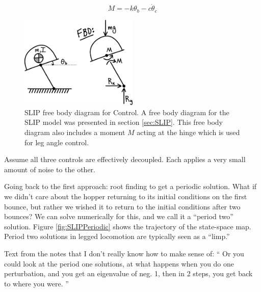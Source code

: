 \begin{equation}
M=-k\theta_{b}-c\dot{\theta}_{c}
\label{eq:HopperBodyControl}
\end{equation}

\begin{figure}[h]		%
\begin{centering}
\includegraphics[width=0.5\textwidth]{Figures/SLIPBodyControl}\par
\end{centering}
\caption[Diagram: SLIP Free Body Diagram for Control]{SLIP free body diagram for Control. A free body diagram for the SLIP model was presented in section \ref{sec:SLIP}. This free body diagram also includes a moment $M$ acting at the hinge which is used for leg angle control.}
\label{fig:SLIPBodyControl}
\end{figure}
%

Assume all three controls are effectively decoupled. Each applies a very small amount of noise to the other. 

Going back to the first approach: root finding to get a periodic solution. What if we didn't care about the hopper returning to its initial conditions on the first bounce, but rather we wished it to return to the initial conditions after two bounces? We can solve numerically for this, and we call it a ``period two'' solution. Figure \ref{fig:SLIPPeriodic} shows the trajectory of the state-space map. Period two solutions in legged locomotion are typically seen as a ``limp.'' 

Text from the notes that I don't really know how to make sense of: `` Or you could look at the period one solutions, at what happens when you do one perturbation, and you get an eigenvalue of neg. 1, then in 2 steps, you get back to where you were. ''

